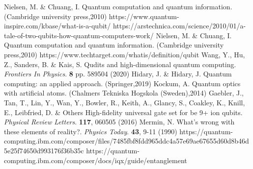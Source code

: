 \documentclass[inscr,ack,preface]{diphdthesis}
\begin{document}
\begin{thebibliography}{99}                                                                     
Nielsen, M. \& Chuang, I. Quantum computation and quantum information. (Cambridge university press,2010)
https://www.quantum-inspire.com/kbase/what-is-a-qubit/
https://arstechnica.com/science/2010/01/a-tale-of-two-qubits-how-quantum-computers-work/
Nielsen, M. \& Chuang, I. Quantum computation and quantum information. (Cambridge university press,2010)
https://www.techtarget.com/whatis/definition/qubit
Wang, Y., Hu, Z., Sanders, B. \& Kais, S. Qudits and high-dimensional quantum computing. {\em Frontiers In Physics}. \textbf{8} pp. 589504 (2020)
Hidary, J. \& Hidary, J. Quantum computing: an applied approach. (Springer,2019)
Kockum, A. Quantum optics with artificial atoms. (Chalmers Tekniska Hogskola (Sweden),2014)
Gaebler, J., Tan, T., Lin, Y., Wan, Y., Bowler, R., Keith, A., Glancy, S., Coakley, K., Knill, E., Leibfried, D. \& Others High-fidelity universal gate set for be 9+ ion qubits. {\em Physical Review Letters}. \textbf{117}, 060505 (2016)
Mermin, N. What's wrong with these elements of reality?. {\em Physics Today}. \textbf{43}, 9-11 (1990)
https://quantum-computing.ibm.com/composer/files/7485fbf8fdd965ddc4a57e69ae67655d60d8b46d5e25f74650d993176f36b35c
https://quantum-computing.ibm.com/composer/docs/iqx/guide/entanglement



\end{thebibliography}
\end{document}
